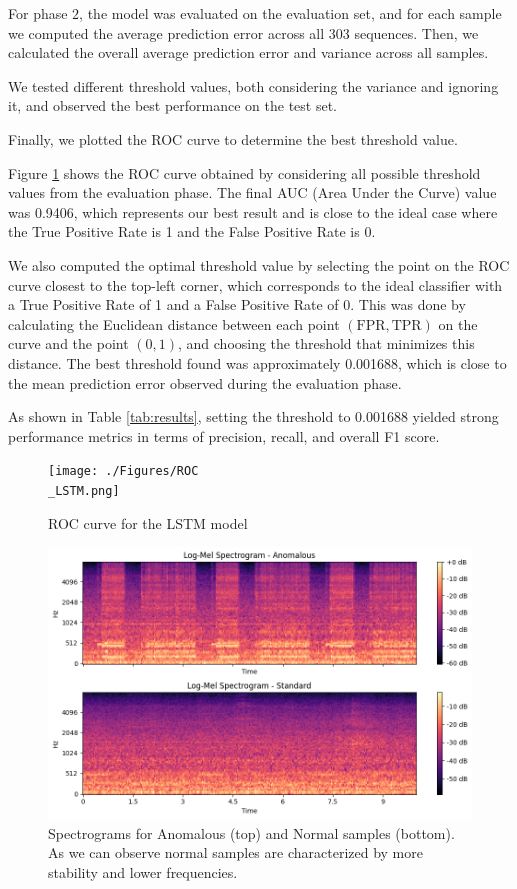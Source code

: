 \documentclass[ngerman]{scrartcl}
\begin{document}
For phase \(2\), the model was evaluated on the evaluation set, and for each sample we computed the average prediction error across all 303 sequences.
Then, we calculated the overall average prediction error and variance across all samples. 

We tested different threshold values, both considering the variance and ignoring it, and observed the best performance on the test set.

Finally, we plotted the ROC curve to determine the best threshold value.

Figure \ref{fig:rocLSTM} shows the ROC curve obtained by considering all possible threshold values from the evaluation phase. The final AUC (Area Under the Curve) value was 0.9406, which represents our best result and is close to the ideal case where the True Positive Rate is 1 and the False Positive Rate is 0.

We also computed the optimal threshold value by selecting the point on the ROC curve closest to the top-left corner, which corresponds to the ideal classifier with a True Positive Rate of 1 and a False Positive Rate of 0. 
This was done by calculating the Euclidean distance between each point \((\text{FPR}, \text{TPR})\) on the curve and the point \((0, 1)\), and choosing the threshold that minimizes this distance. 
The best threshold found was approximately 0.001688, which is close to the mean prediction error observed during the evaluation phase.


As shown in Table \ref{tab:results}, setting the threshold to 0.001688 yielded strong performance metrics in terms of precision, recall, and overall F1 score.

\begin{figure}[h]
    \centering
    \texttt{[image: ./Figures/ROC\\\_LSTM.png]}
    \caption{ROC curve for the LSTM model}
    \label{fig:rocLSTM}
\end{figure}

\begin{figure}[h]
    \centering
    \includegraphics[width=.5\textwidth]{./Figures/spectograms.png}
    \caption{Spectrograms for Anomalous (top) and Normal samples (bottom). As we can observe normal samples are characterized by more stability and lower frequencies.}
    \label{fig:spectograms}
\end{figure}
\end{document}
